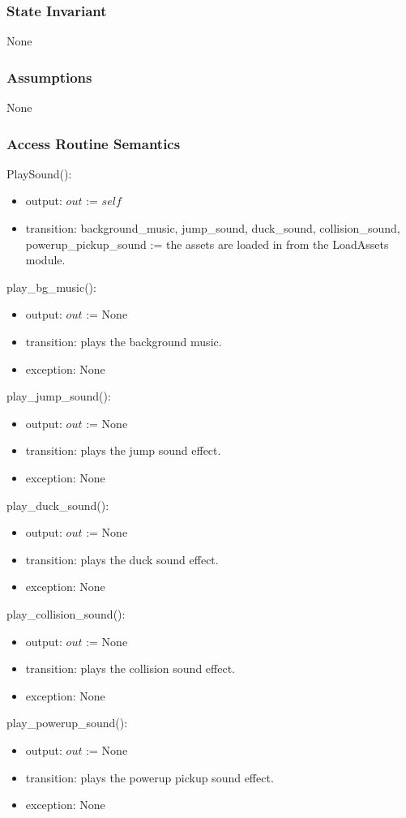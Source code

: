 \documentclass[12pt]{article}
\begin{document}
\subsubsection* {State Invariant}

None

\subsubsection* {Assumptions}

None

\subsubsection* {Access Routine Semantics}

PlaySound():
\begin{itemize}
    \item output: $out$ := $self$
    \item transition: background\_music, jump\_sound, duck\_sound, collision\_sound, powerup\_pickup\_sound := the assets are loaded in from the LoadAssets module.
\end{itemize}
\noindent  play\_bg\_music():
\begin{itemize}
    \item output: $out$ := None
    \item transition: plays the background music.
    \item exception: None
\end{itemize}
\noindent play\_jump\_sound():
\begin{itemize}
    \item output: $out$ := None
    \item transition: plays the jump sound effect.
    \item exception: None
\end{itemize}
\noindent  play\_duck\_sound():
\begin{itemize}
    \item output: $out$ := None
    \item transition: plays the duck sound effect.
    \item exception: None
\end{itemize}
\noindent  play\_collision\_sound():
\begin{itemize}
    \item output: $out$ := None
    \item transition: plays the collision sound effect.
    \item exception: None
\end{itemize}
\noindent  play\_powerup\_sound():
\begin{itemize}
    \item output: $out$ := None
    \item transition: plays the powerup pickup sound effect.
    \item exception: None
\end{itemize}
\newpage
\end{document}
